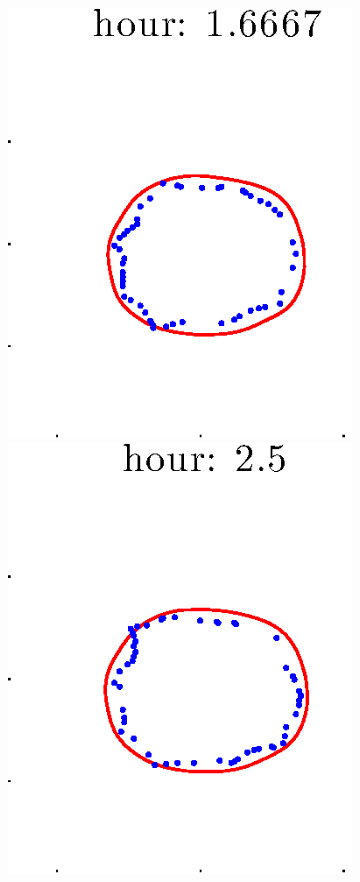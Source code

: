 \documentclass[12pt]{article}
\begin{document}
\begin{figure}[h!]
\begin{subfigure}[b]{.3\textwidth}
		\includegraphics[height=.15\textheight]{Pos10exp2/firsthalf/second3.eps}
		\includegraphics[height=.15\textheight]{Pos10exp2/firsthalf/second4.eps}

\end{subfigure}
\end{figure}
\end{document}

